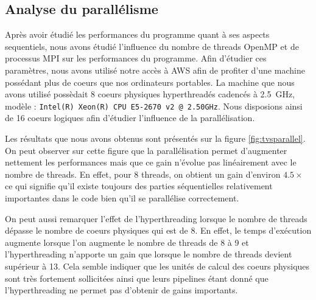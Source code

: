 \documentclass[11pt,a4paper]{article}
\begin{document}
	\subsection{Analyse du parallélisme}
		Après avoir étudié les performances du programme quant à ses aspects sequentiels, nous avons étudié l'influence du nombre de threads OpenMP et de processus MPI sur les performances du programme. Afin d'étudier ces paramètres, nous avons utilisé notre accès à AWS afin de profiter d'une machine possédant plus de coeurs que nos ordinateurs portables. La machine que nous avons utilisé possèdait 8 coeurs physiques hyperthreadés cadencés à \SI{2.5}{\giga\hertz}, modèle : \texttt{Intel(R) Xeon(R) CPU E5-2670 v2 @ 2.50GHz}. Nous disposions ainsi de 16 coeurs logiques afin d'étudier l'influence de la parallélisation. 
		
		Les résultats que nous avons obtenus sont présentés sur la figure \ref{fig:tvsparallel}. On peut observer sur cette figure que la parallélisation permet d'augmenter nettement les performances mais que ce gain n'évolue pas linéairement avec le nombre de threads. En effet, pour 8 threads, on obtient un gain d'environ $4.5\times$ ce qui signifie qu'il existe toujours des parties séquentielles relativement importantes dans le code bien qu'il se parallélise correctement. 
		
		On peut aussi remarquer l'effet de l'hyperthreading lorsque le nombre de threads dépasse le nombre de coeurs physiques qui est de 8. En effet, le temps d'exécution augmente lorsque l'on augmente le nombre de threads de 8 à 9 et l'hyperthreading n'apporte un gain que lorsque le nombre de threads devient supérieur à 13. Cela semble indiquer que les unités de calcul des coeurs physiques sont très fortement sollicitées ainsi que leurs pipelines étant donné que l'hyperthreading ne permet pas d'obtenir de gains importants.
		
\end{document}
